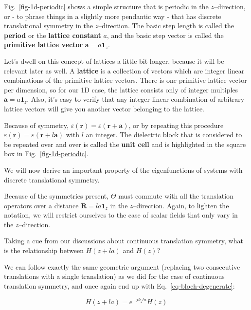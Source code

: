 Fig.~\ref{fig-1d-periodic} shows a simple structure that is periodic in the $z$--direction, or - to phrase things in a slightly more pendantic way - that has discrete translational symmetry in the $z$--direction. The basic step length is called the \textbf{period} or the \textbf{lattice constant} $a$, and the basic step vector is called the \textbf{primitive lattice vector} ${\mathbf a} = a {\mathbf 1}_z$.

Let's dwell on this concept of lattices a little bit longer, because it will be relevant later as well. A \textbf{lattice} is a collection of vectors which are integer linear combinations of the primitive lattice vectors. There is one primitive lattice vector per dimension, so for our 1D case, the lattice consists only of integer multiples  ${\mathbf a} = a {\mathbf 1}_z$. Also, it's easy to verify that any integer linear combination of arbitrary lattice vectors will give you another vector belonging to the lattice.

Because of symmetry, $\varepsilon({\mathbf r}) =  \varepsilon({\mathbf r} + {\mathbf a})$, or by repeating this procedure $\varepsilon({\mathbf r}) =  \varepsilon({\mathbf r} + l {\mathbf a})$ with $l$ an integer. The dielectric block that is considered to be repeated over and over is called the \textbf{unit cell} and is highlighted in the square box in Fig.~\ref{fig-1d-periodic}. 

We will now derive an important property of the eigenfunctions of systems with discrete translational symmetry.

Because of the symmetries present, $\Theta$ must commute with all the translation operators over a distance ${\mathbf R} = l a {\mathbf 1}_z$ in the $z$--direction. Again, to lighten the notation, we will restrict ourselves to the case of scalar fields that only vary in the $z$--direction.

\begin{cue}
Taking a cue from our discussions about continuous translation symmetry, what is the relationship between $H(z + la)$ and $H(z)$?
\end{cue}

We can follow exactly the same geometric argument (replacing two consecutive translations with a single translation) as we did for the case of continuous translation symmetry, and once again end up with Eq.~\ref{eq-bloch-degenerate}: 

\begin{equation}
H(z + la) = e^{-j k_z la} H(z)
\end{equation} 

